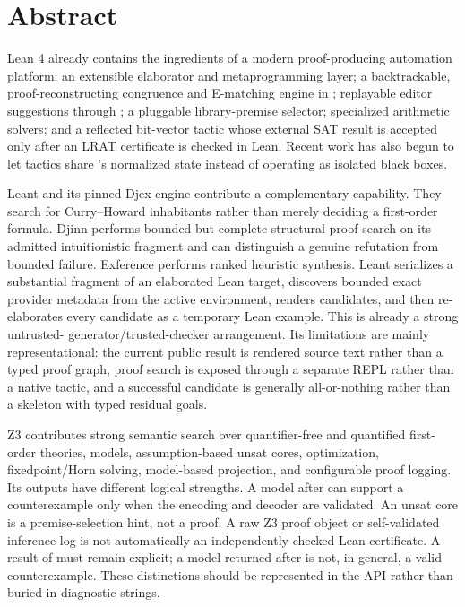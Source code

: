 \documentclass[11pt,letterpaper,openany]{report}
\newcommand{\code}[1]{\texttt{\detokenize{#1}}}
\begin{document}
\hypersetup{pageanchor=true}

\chapter*{Abstract}
Lean 4 already contains the ingredients of a modern proof-producing automation
platform: an extensible elaborator and metaprogramming layer; a backtrackable,
proof-reconstructing congruence and E-matching engine in \code{grind}; replayable
editor suggestions through \code{TryThis}; a pluggable library-premise selector;
specialized arithmetic solvers; and a reflected bit-vector tactic whose external
SAT result is accepted only after an LRAT certificate is checked in Lean. Recent
work has also begun to let tactics share \code{grind}'s normalized state instead of
operating as isolated black boxes.

Leant and its pinned Djex engine contribute a complementary capability. They search
for Curry--Howard inhabitants rather than merely deciding a first-order formula.
Djinn performs bounded but complete structural proof search on its admitted
intuitionistic fragment and can distinguish a genuine refutation from bounded
failure. Exference performs ranked heuristic synthesis. Leant serializes a
substantial fragment of an elaborated Lean target, discovers bounded exact provider
metadata from the active environment, renders candidates, and then re-elaborates
every candidate as a temporary Lean example. This is already a strong untrusted-
generator/trusted-checker arrangement. Its limitations are mainly representational:
the current public result is rendered source text rather than a typed proof graph,
proof search is exposed through a separate REPL rather than a native tactic, and a
successful candidate is generally all-or-nothing rather than a skeleton with typed
residual goals.

Z3 contributes strong semantic search over quantifier-free and quantified
first-order theories, models, assumption-based unsat cores, optimization,
fixedpoint/Horn solving, model-based projection, and configurable proof logging. Its
outputs have different logical strengths. A model after \code{sat} can support a
counterexample only when the encoding and decoder are validated. An unsat core is a
premise-selection hint, not a proof. A raw Z3 proof object or self-validated inference
log is not automatically an independently checked Lean certificate. A result of
\code{unknown} must remain explicit; a model returned after \code{unknown} is not, in
general, a valid counterexample. These distinctions should be represented in the API
rather than buried in diagnostic strings.
\end{document}
